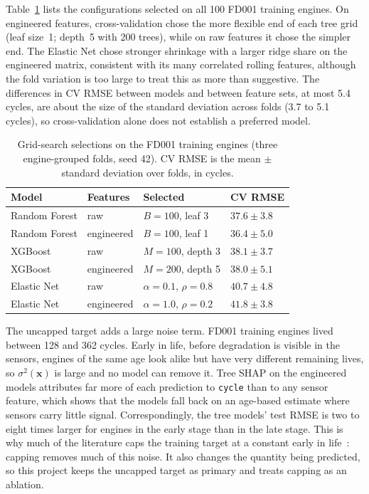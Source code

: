 Table~\ref{tab:model_selection} lists the configurations selected on all 100
FD001 training engines. On engineered features, cross-validation chose the
more flexible end of each tree grid (leaf size~1; depth~5 with 200 trees),
while on raw features it chose the simpler end. The Elastic Net chose stronger
shrinkage with a larger ridge share on the engineered matrix, consistent with
its many correlated rolling features, although the fold variation is too
large to treat this as more than suggestive. The differences in CV RMSE
between models and between feature sets, at most 5.4 cycles, are about the
size of the standard deviation across folds (3.7 to 5.1 cycles), so
cross-validation alone does not establish a preferred model.

\begin{table}[t]
\centering
\caption{Grid-search selections on the FD001 training engines (three
engine-grouped folds, seed 42). CV RMSE is the mean $\pm$ standard deviation
over folds, in cycles.}
\label{tab:model_selection}
\begin{tabular}{llll}
\hline
Model & Features & Selected & CV RMSE \\
\hline
Random Forest & raw        & $B=100$, leaf 3          & $37.6\pm3.8$ \\
Random Forest & engineered & $B=100$, leaf 1          & $36.4\pm5.0$ \\
XGBoost       & raw        & $M=100$, depth 3         & $38.1\pm3.7$ \\
XGBoost       & engineered & $M=200$, depth 5         & $38.0\pm5.1$ \\
Elastic Net   & raw        & $\alpha=0.1$, $\rho=0.8$ & $40.7\pm4.8$ \\
Elastic Net   & engineered & $\alpha=1.0$, $\rho=0.2$ & $41.8\pm3.8$ \\
\hline
\end{tabular}
\end{table}

The uncapped target adds a large noise term. FD001 training engines lived
between 128 and 362 cycles. Early in life, before degradation is visible in the
sensors, engines of the same age look alike but have very different remaining
lives, so $\sigma^2(\mathbf{x})$ is large and no model can remove it. Tree SHAP
on the engineered models attributes far more of each prediction to
\texttt{cycle} than to any sensor feature, which shows that the models fall back on
an age-based estimate where sensors carry little signal. Correspondingly, the
tree models' test RMSE is two to eight times larger for engines in the early
stage than in the late stage. This is why much of the
literature caps the training target at a constant early in
life~\cite{Heimes2008recurrent,Zheng2017long}: capping removes much of this
noise. It also changes the quantity being predicted, so this project keeps the
uncapped target as primary and treats capping as an ablation.

